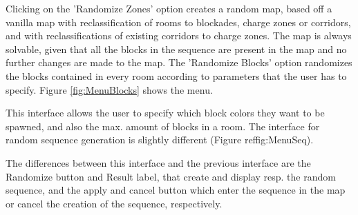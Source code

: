 Clicking on the 'Randomize Zones' option creates a random map, based off a vanilla map with reclassification of rooms to blockades, charge zones or corridors, and with reclassifications of existing corridors to charge zones. The map is always solvable, given that all the blocks in the sequence are present in the map and no further changes are made to the map. The 'Randomize Blocks' option randomizes the blocks contained in every room according to parameters that the user has to specify. Figure 	\ref{fig:MenuBlocks} shows the menu.

This interface allows the user to specify which block colors they want to be spawned, and also the max. amount of blocks in a room. The interface for random sequence generation is slightly different (Figure ref{fig:MenuSeq}).



The differences between this interface and the previous interface are the Randomize button and Result label, that  create and display resp. the random sequence, and the apply and cancel button which enter the sequence in the map or cancel the creation of the sequence, respectively.


